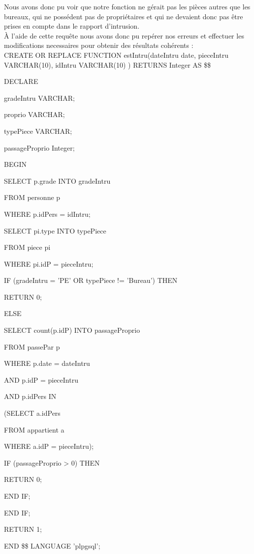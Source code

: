 Nous avons donc pu voir que notre fonction ne gérait pas les pièces autres que les bureaux, qui ne possédent pas de propriétaires et qui ne devaient donc pas être prises en compte dans le rapport d'intrusion.\\

À l'aide de cette requête nous avons donc pu repérer nos erreurs et effectuer les modifications necessaires pour obtenir des résultats cohérents :\\

CREATE OR REPLACE FUNCTION estIntru(dateIntru date, pieceIntru VARCHAR(10), idIntru VARCHAR(10) ) RETURNS Integer AS \$\$

DECLARE

	gradeIntru VARCHAR;
	
	proprio VARCHAR;
	
	typePiece VARCHAR;
	
	passageProprio Integer;
	

BEGIN
	
	SELECT p.grade INTO gradeIntru
	
	FROM personne p
	
	WHERE p.idPers = idIntru;

	
	SELECT pi.type INTO typePiece
	
	FROM piece pi
	
	WHERE pi.idP = pieceIntru;


	
	IF (gradeIntru = 'PE' OR typePiece != 'Bureau') THEN
	
		RETURN 0;
	
	ELSE
	
		SELECT count(p.idP) INTO passageProprio
	
		FROM passePar p
	
		WHERE p.date = dateIntru
	
			AND p.idP = pieceIntru
	
			AND p.idPers IN 
	
				(SELECT a.idPers
	
				FROM appartient a
	
				WHERE a.idP = pieceIntru);
	
		IF (passageProprio > 0) THEN
	
			RETURN 0;
	
		END IF;
	
	END IF;

	
	RETURN 1;

END \$\$ LANGUAGE 'plpgsql';